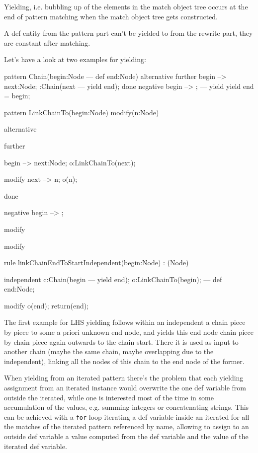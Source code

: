 Yielding, i.e. bubbling up of the elements in the match object tree occurs at the end of pattern matching when the match object tree gets constructed.

\begin{warning}
A def entity from the pattern part can't be yielded to from the rewrite part, they are constant after matching.
\end{warning}

Let's have a look at two examples for yielding:

\begin{example}
  \begin{grgen}
pattern Chain(begin:Node --- def end:Node)
{
  alternative {
    further {
      begin --> next:Node;
      :Chain(next --- yield end);
    }
    done {
      negative {
        begin --> ;
      }
      ---
      yield {
        yield end = begin;
      }
    }
  }
}

pattern LinkChainTo(begin:Node) modify(n:Node)
{
  alternative {
    further {
      begin --> next:Node;
      o:LinkChainTo(next);

      modify {
        next --> n;
        o(n);
      }
    }
    done {
      negative {
        begin --> ;
      }
		  
      modify {
      }
    }
  }

  modify { }
}

rule linkChainEndToStartIndependent(begin:Node) : (Node)
{	
  independent {
    c:Chain(begin --- yield end);
  }
  o:LinkChainTo(begin);
--- 
  def end:Node;

  modify {
    o(end);
    return(end);
  }
}
  \end{grgen}
\end{example}

The first example for LHS yielding follows within an independent a chain piece by piece to some a priori unknown end node, and yields this end node chain piece by chain piece again outwards to the chain start. There it is used as input to another chain (maybe the same chain, maybe overlapping due to the independent), linking all the nodes of this chain to the end node of the former.

When yielding from an iterated pattern there's the problem that each yielding assignment from an iterated instance would overwrite the one def variable from outside the iterated, while one is interested most of the time in some accumulation of the values, e.g. summing integers or concatenating strings.
This can be achieved with a \texttt{for} loop iterating a def variable inside an iterated for all the matches of the iterated pattern referenced by name, allowing to assign to an outside def variable a value computed from the def variable and the value of the iterated def variable.

